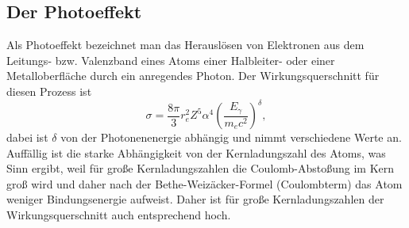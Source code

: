 \subsection{Der Photoeffekt}
Als Photoeffekt bezeichnet man das Herauslösen von Elektronen aus dem Leitungs- bzw. Valenzband eines Atoms einer Halbleiter- oder einer Metalloberfläche durch ein anregendes Photon.
Der Wirkungsquerschnitt für diesen Prozess ist
\begin{equation*}
	\sigma = \frac{8\pi}{3}r_e^2Z^5\alpha^4\left(\frac{E_\gamma}{m_ec^2}\right)^\delta,
\end{equation*}
dabei ist $\delta$ von der Photonenenergie abhängig und nimmt verschiedene Werte an.
Auffällig ist die starke Abhängigkeit von der Kernladungszahl des Atoms, was Sinn ergibt, weil für große Kernladungszahlen die Coulomb-Abstoßung im Kern groß wird und daher nach der Bethe-Weizäcker-Formel (Coulombterm) das Atom weniger Bindungsenergie aufweist.
Daher ist für große Kernladungszahlen der Wirkungsquerschnitt auch entsprechend hoch.

